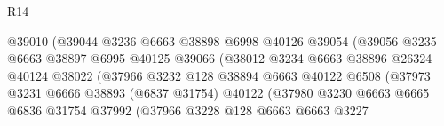\begin{lexlean}{R14}
\begin{coremodule}
                                        @39010
                                        (@39044
                                          @3236
                                          @6663
                                          @38898
                                          @6998
                                          @40126
                                          @39054
                                          (@39056
                                            @3235
                                            @6663
                                            @38897
                                            @6995
                                            @40125
                                            @39066
                                            (@38012
                                              @3234
                                              @6663
                                              @38896
                                              @26324
                                              @40124
                                              @38022
                                              (@37966
                                                @3232
                                                @128
                                                @38894
                                                @6663
                                                @40122
                                                @6508
                                                (@37973
                                                  @3231
                                                  @6666
                                                  @38893
                                                  (@6837 @31754)
                                                  @40122
                                                  (@37980
                                                    @3230
                                                    @6663
                                                    @6665
                                                    @6836
                                                    @31754
                                                    @37992
                                                    (@37966
                                                      @3228
                                                      @128
                                                      @6663
                                                      @6663
                                                      @3227

\end{coremodule}
\end{lexlean}
